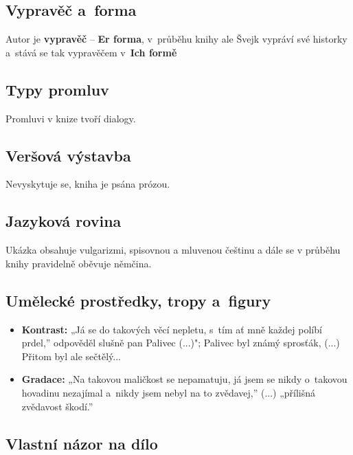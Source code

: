 \subsection{Vypravěč a~forma}
Autor je \textbf{vypravěč} -- \textbf{Er forma}, v~průběhu knihy ale Švejk vypráví své historky a~stává se tak vypravěčem v~\textbf{Ich formě}

\subsection{Typy promluv}
Promluvi v knize tvoří dialogy.

\subsection{Veršová výstavba}
Nevyskytuje se, kniha je psána prózou.

\subsection{Jazyková rovina}
Ukázka obsahuje vulgarizmi, spisovnou a mluvenou češtinu a dále se v průběhu knihy pravidelně oběvuje němčina.

\subsection{Umělecké prostředky, tropy a~figury}
\begin{itemize}
    \item \textbf{Kontrast:} „Já se do takových věcí nepletu, s~tím ať mně každej políbí prdel,” odpověděl slušně pan Palivec (...)"; Palivec byl známý sprosťák, (...) Přitom byl ale sečtělý...
    \item \textbf{Gradace:} „Na takovou maličkost se nepamatuju, já jsem se nikdy o~takovou hovadinu nezajímal a~nikdy jsem nebyl na to zvědavej,” (...) „přílišná zvědavost škodí.”
\end{itemize}

\subsection{Vlastní názor na dílo}

